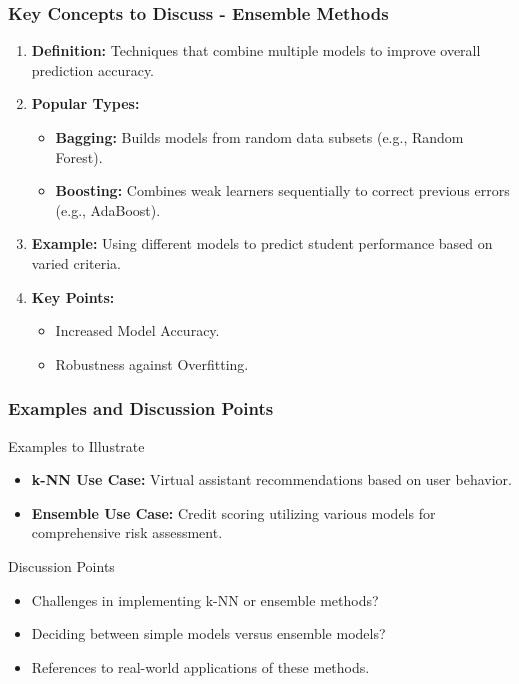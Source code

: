 \documentclass[aspectratio=169]{beamer}
\begin{document}
\begin{frame}[fragile]
    \frametitle{Key Concepts to Discuss - Ensemble Methods}
    \begin{enumerate}
        \item \textbf{Definition:} Techniques that combine multiple models to improve overall prediction accuracy.
        
        \item \textbf{Popular Types:} 
        \begin{itemize}
            \item \textbf{Bagging:} Builds models from random data subsets (e.g., Random Forest).
            \item \textbf{Boosting:} Combines weak learners sequentially to correct previous errors (e.g., AdaBoost).
        \end{itemize}
        
        \item \textbf{Example:} Using different models to predict student performance based on varied criteria.
        
        \item \textbf{Key Points:} 
        \begin{itemize}
            \item Increased Model Accuracy.
            \item Robustness against Overfitting.
        \end{itemize}
    \end{enumerate}
\end{frame}

\begin{frame}[fragile]
    \frametitle{Examples and Discussion Points}
    \begin{block}{Examples to Illustrate}
        \begin{itemize}
            \item \textbf{k-NN Use Case:} Virtual assistant recommendations based on user behavior.
            \item \textbf{Ensemble Use Case:} Credit scoring utilizing various models for comprehensive risk assessment.
        \end{itemize}
    \end{block}
    
    \begin{block}{Discussion Points}
        \begin{itemize}
            \item Challenges in implementing k-NN or ensemble methods?
            \item Deciding between simple models versus ensemble models?
            \item References to real-world applications of these methods.
        \end{itemize}
    \end{block}
\end{frame}
\end{document}
